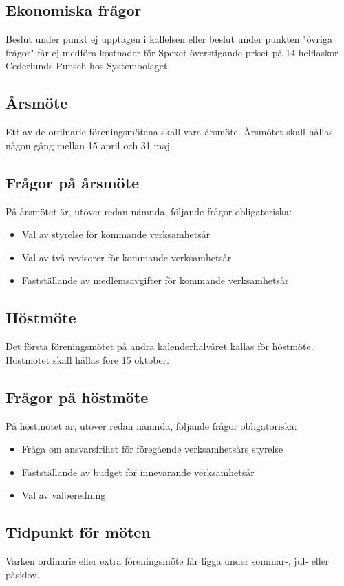 \documentclass[a4paper]{article}
\begin{document}
\subsection{Ekonomiska frågor}
Beslut under punkt ej upptagen i kallelsen eller beslut under punkten "övriga frågor" får ej medföra kostnader för Spexet överstigande priset på 14 helflaskor Cederlunds Punsch hos Systembolaget.

\subsection{Årsmöte}
Ett av de ordinarie föreningsmötena skall vara årsmöte. Årsmötet skall hållas någon gång mellan 15 april och 31 maj.

\subsection{Frågor på årsmöte}
På årsmötet är, utöver redan nämnda, följande frågor obligatoriska:

\begin{itemize}
  \item Val av styrelse för kommande verksamhetsår
  \item Val av två revisorer för kommande verksamhetsår
  \item Fastställande av medlemsavgifter för kommande verksamhetsår
\end{itemize}

\subsection{Höstmöte}
Det första föreningsmötet på andra kalenderhalvåret kallas för höstmöte. Höstmötet skall hållas före 15 oktober.

\subsection{Frågor på höstmöte}
På höstmötet är, utöver redan nämnda, följande frågor obligatoriska:

\begin{itemize}
  \item Fråga om ansvarsfrihet för föregående verksamhetsårs styrelse
  \item Fastställande av budget för innevarande verksamhetsår
  \item Val av valberedning
\end{itemize}

\subsection{Tidpunkt för möten}
Varken ordinarie eller extra föreningsmöte får ligga under sommar-, jul- eller påsklov.
\end{document}
